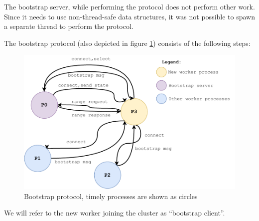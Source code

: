 \documentclass[12pt]{extarticle}
\begin{document}
The bootstrap server, while performing the protocol does not perform other work. Since it needs to use non-thread-safe data
structures, it was not possible to spawn a separate thread to perform the protocol.


The bootstrap protocol (also depicted in figure \ref{fig:bootstrapprotocol}) consists of the following steps:

\begin{figure}[h]
    \centerline{\includegraphics[width=.8\linewidth]{imgs/bootstrapprotocol.pdf}}
    \caption{Bootstrap protocol, timely processes are shown as circles}
    \label{fig:bootstrapprotocol}
\end{figure}

We will refer to the new worker joining the cluster as ``bootstrap client''.
\end{document}
